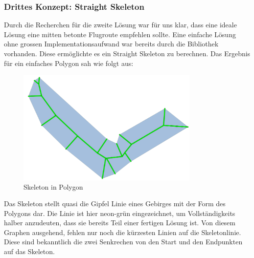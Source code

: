 \subsubsection{Drittes Konzept: Straight Skeleton}
Durch die Recherchen für die zweite Lösung war für uns klar, dass eine ideale Lösung eine mitten betonte Flugroute empfehlen sollte. Eine einfache Lösung ohne grossen Implementationsaufwand war bereits durch die  Bibliothek vorhanden. Diese ermöglichte es ein Straight Skeleton zu berechnen. Das Ergebnis für ein einfaches Polygon sah wie folgt aus:
\begin{figure}[h]
	\centering
	\includegraphics[width=0.8\textwidth]{images/routing/skeleton.png}
	\caption{Skeleton in Polygon}
	\label{fig:skeleton-in-polygon}
\end{figure}
Das Skeleton stellt quasi die Gipfel Linie eines Gebirges mit der Form des Polygons dar. Die Linie ist hier neon-grün eingezeichnet, um Vollständigkeits halber anzudeuten, dass sie bereits Teil einer fertigen Lösung ist. Von diesem Graphen ausgehend, fehlen nur noch die kürzesten Linien auf die Skeletonlinie. Diese sind bekanntlich die zwei Senkrechen von den Start und den Endpunkten auf das Skeleton. 
